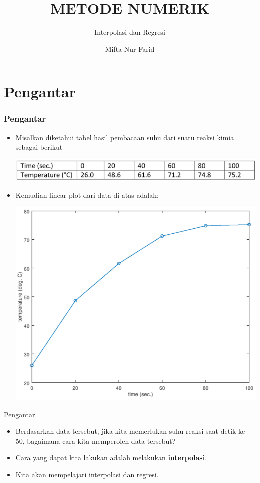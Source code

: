\documentclass[pdflatex,compress]{beamer}
\title{METODE NUMERIK}
\subtitle{Interpolasi dan Regresi}
\author{Mifta Nur Farid}
\begin{document}
\maketitle

\section{Pengantar}

\begin{frame}
	\frametitle{Pengantar}
	\begin{itemize}
		\item Misalkan diketahui tabel hasil pembacaan suhu dari suatu reaksi kimia sebagai berikut
		\begin{center}
			\includegraphics[width=0.8\linewidth]{img/img01}
		\end{center}
		\item Kemudian linear plot dari data di atas adalah:
		\begin{center}
			\includegraphics[width=0.5\linewidth]{img/img02}
		\end{center}
	\end{itemize}
\end{frame}

\begin{frame}{Pengantar}
	\begin{itemize}
		\item Berdasarkan data tersebut, jika kita memerlukan suhu reaksi saat detik ke 50, bagaimana cara kita memperoleh data tersebut?
		\item Cara yang dapat kita lakukan adalah melakukan \textbf{interpolasi}.
		\item Kita akan mempelajari interpolasi dan regresi.
	\end{itemize}
\end{frame}
\end{document}
